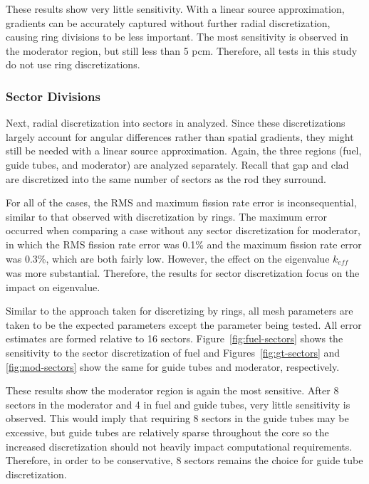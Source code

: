 These results show very little sensitivity. With a linear source approximation, gradients can be accurately captured without further radial discretization, causing ring divisions to be less important. The most sensitivity is observed in the moderator region, but still less than 5 pcm. Therefore, all tests in this study do not use ring discretizations. 

\subsubsection{Sector Divisions}

Next, radial discretization into sectors in analyzed. Since these  discretizations largely account for angular differences rather than spatial gradients, they might still be needed with a linear source approximation. Again, the three regions (fuel, guide tubes, and moderator) are analyzed separately. Recall that gap and clad are discretized into the same number of sectors as the rod they surround.

For all of the cases, the RMS and maximum fission rate error is inconsequential, similar to that observed with discretization by rings.  The maximum error occurred when comparing a case without any sector discretization for moderator, in which the RMS fission rate error was 0.1\% and the maximum fission rate error was 0.3\%, which are both fairly low. However, the effect on the eigenvalue $k_{\textit{eff}}$ was more substantial. Therefore, the results for sector discretization focus on the impact on eigenvalue.

Similar to the approach taken for discretizing by rings, all mesh parameters are taken to be the expected parameters except the parameter being tested. All error estimates are formed relative to 16 sectors. Figure~\ref{fig:fuel-sectors} shows the sensitivity to the sector discretization of fuel and Figures~\ref{fig:gt-sectors} and \ref{fig:mod-sectors} show the same for guide tubes and moderator, respectively.

These results show the moderator region is again the most sensitive. After 8 sectors in the moderator and 4 in fuel and guide tubes, very little sensitivity is observed. This would imply that requiring 8 sectors in the guide tubes may be excessive, but guide tubes are relatively sparse throughout the core so the increased discretization should not heavily impact computational requirements. Therefore, in order to be conservative, 8 sectors remains the choice for guide tube discretization.
 
